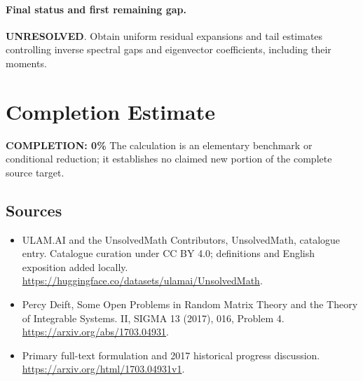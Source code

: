 \documentclass[11pt]{article}
\begin{document}
\paragraph{Final status and first remaining gap.}
\textbf{UNRESOLVED}. Obtain uniform residual expansions and tail estimates controlling inverse spectral gaps and eigenvector coefficients, including their moments.

\section{Completion Estimate}
\noindent\textbf{COMPLETION: 0\%}
The calculation is an elementary benchmark or conditional reduction; it establishes no claimed new portion of the complete source target.

\subsection{Sources}
\begin{itemize}
\item[\hypertarget{source:statement:1}{S1}] ULAM.AI and the UnsolvedMath Contributors, UnsolvedMath, catalogue entry. Catalogue curation under CC BY 4.0; definitions and English exposition added locally.
\url{https://huggingface.co/datasets/ulamai/UnsolvedMath}.
\item[\hypertarget{source:statement:2}{S2}] Percy Deift, Some Open Problems in Random Matrix Theory and the Theory of Integrable Systems. II, SIGMA 13 (2017), 016, Problem 4.
\url{https://arxiv.org/abs/1703.04931}.
\item[\hypertarget{source:statement:3}{S3}] Primary full-text formulation and 2017 historical progress discussion.
\url{https://arxiv.org/html/1703.04931v1}.
\end{itemize}
\label{end:statement}
\end{document}
